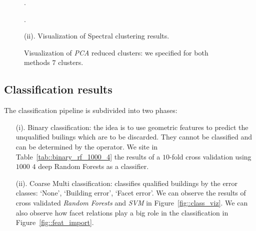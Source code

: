 \documentclass[a4paper, 11pt]{article}
\begin{document}
\begin{figure}[H]
{{\begin{subfloatrow}[2]
{					}
					{
						\caption{.}\label{fig::spectral_1}
					}
					{
						\caption{.}\label{fig::spectral_2}
					}
				\end{subfloatrow}
			}
			{
				\caption*{(ii). Visualization of Spectral clustering results.}
			}
		}
		{
			\caption{\label{fig::clust_viz} Visualization of \textit{PCA} reduced clusters: we specified for both methods $7$ clusters.}
		}
	\end{figure}

	\subsection{Classification results}

	The classification pipeline is subdivided into two phases:

	\begin{itemize}
		\item[(i).] Binary classification: the idea is to use geometric features to predict the unqualified builings which are to be discarded. They cannot be classified and can be determined by the operator. We site in Table~\ref{tab::binary_rf_1000_4} the results of a $10$-fold cross validation using $1000$ $4$ deep Random Forests as a classifier.

		\item[(ii).] Coarse Multi classification: classifies qualified buildings by the error classes: `None', `Building error', `Facet error'. We can observe the results of cross validated \textit{Random Forests} and \textit{SVM} in Figure~\ref{fig::class_viz}. We can also observe how facet relations play a big role in the classification in Figure~\ref{fig::feat_import}.
	\end{itemize}
\end{document}
